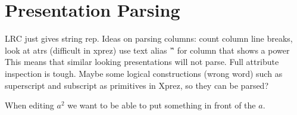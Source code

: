 \chapter{Presentation Parsing}
LRC just gives string rep.
Ideas on parsing columns:
count column line breaks, look at atrs (difficult in xprez) use text alias '\^' for column that shows a power
This means that similar looking presentations will not parse. 
Full attribute inspection is tough. Maybe some logical constructions (wrong word) such as superscript and subscript as primitives in Xprez, so they can be parsed?

When editing $a^2$ we want to be able to put something in front of the $a$.
